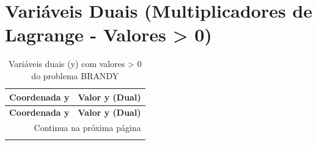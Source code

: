 \documentclass[12pt]{article}
\begin{document}
\section{Variáveis Duais (Multiplicadores de Lagrange - Valores > 0)}

\begin{longtable}{@{}cc@{}}
\caption{Variáveis duais (y) com valores > 0 do problema BRANDY} \\
\toprule
\textbf{Coordenada y} & \textbf{Valor y (Dual)} \\
\midrule
\endfirsthead

\toprule
\textbf{Coordenada y} & \textbf{Valor y (Dual)} \\
\midrule
\endhead

\midrule \multicolumn{2}{r}{{Continua na próxima página}} \\ \midrule
\endfoot


\end{longtable}
\end{document}
